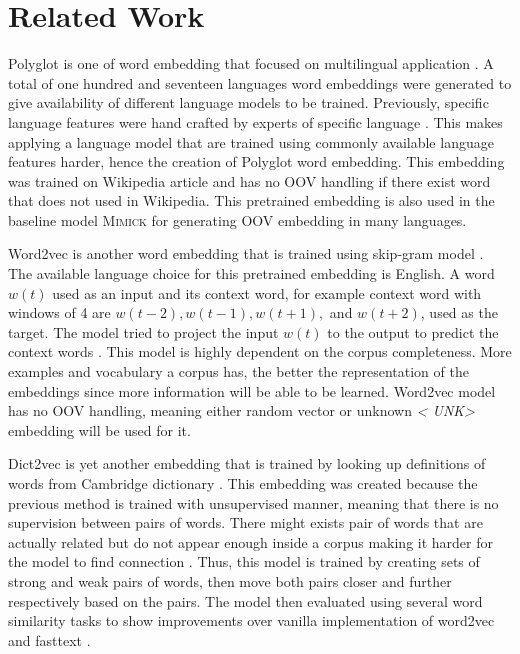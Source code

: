 \chapter{Related Work}
\label{chap:relatedwork}

Polyglot is one of word embedding that focused on multilingual
application \citep{polyglot2013alrfou}. A total of one hundred and
seventeen languages word embeddings were generated to give
availability of different language models to be trained. Previously,
specific language features were hand crafted by experts of specific
language \citep{polyglot2013alrfou}. This makes applying a language
model that are trained using commonly available language features
harder, hence the creation of Polyglot word embedding. This embedding
was trained on Wikipedia article and has no OOV handling if there
exist word that does not used in Wikipedia. This pretrained embedding
is also used in the baseline model \textsc{Mimick} for generating OOV
embedding in many languages.

Word2vec is another word embedding that is trained using skip-gram
model \citep{efficient2013mikolov}. The available language choice for
this pretrained embedding is English. A word $w(t)$ used as an input
and its context word, for example context word with windows of 4 are
$w(t-2), w(t-1), w(t+1),$ and $w(t+2)$, used as the target. The model
tried to project the input $w(t)$ to the output to predict the context
words \citep{efficient2013mikolov}. This model is highly dependent on
the corpus completeness. More examples and vocabulary a corpus has,
the better the representation of the embeddings since more information
will be able to be learned. Word2vec model has no OOV handling,
meaning either random vector or unknown \textit{\textless
UNK\textgreater} embedding will be used for it.

Dict2vec is yet another embedding that is trained by looking up
definitions of words from Cambridge dictionary
\citep{tissier2017dict2vec}. This embedding was created because the
previous method is trained with unsupervised manner, meaning that
there is no supervision between pairs of words. There might exists
pair of words that are actually related but do not appear enough
inside a corpus making it harder for the model to find connection
\citep{tissier2017dict2vec}. Thus, this model is trained by creating
sets of strong and weak pairs of words, then move both pairs closer
and further respectively based on the pairs. The model then evaluated
using several word similarity tasks to show improvements over vanilla
implementation of word2vec and fasttext \citep{tissier2017dict2vec}. 

